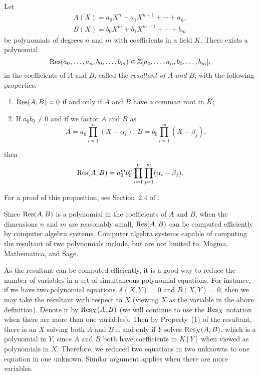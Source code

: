 \begin{proposition}
  Let
  \[
  \begin{gathered}
    A(X) = a_0 X^n + a_1 X^{n-1} + \cdots + a_n,\\
    B(X) = b_0 X^m + b_1 X^{m-1} + \cdots + b_m
  \end{gathered}
  \]
  be polynomials of degrees $n$ and $m$ with coefficients
  in a field $K$. There exists a polynomial
  \[
  \mathrm{Res}(a_0, \dots, a_n, b_0, \dots, b_m) \in \mathbb{Z}[a_0, \dots, a_n, b_0,
  \dots, b_m],
  \]
  in the coefficients of $A$ and $B$, called the \emph{resultant of
    $A$ and $B$}, with the following properties:
  \begin{enumerate}
  \item $\mathrm{Res}(A, B) = 0$ if and only if $A$ and $B$ have a comman root
    in $\bar{K}$;

  \item If $a_0 b_0 \ne 0$ and if we factor $A$ and $B$ as
    \[
    A = a_0 \prod_{i=1}^n (X - \alpha_i),\,
    B = b_0 \prod_{i=1}^m (X - \beta_j),
    \]
  \end{enumerate}
  then
  \[
  \mathrm{Res}(A, B) = a_0^m b_0^n \prod_{i=1}^n \prod_{j=1}^m (\alpha_i -
  \beta_j).
  \]
\end{proposition}

For a proof of this proposition, see Section~2.4 of \cite{MR2316407}.

\begin{remark}
  Since $\mathrm{Res}(A, B)$ is a polynomial in the coefficients of $A$ and
  $B$, when the dimensions $n$ and $m$ are reasonably small, $\mathrm{Res}(A,
  B)$ can be computed efficiently by computer algebra
  systems. Computer algebra systems capable of computing the resultant
  of two polynomials include, but are not limited to, Magma,
  Mathematica, and Sage.

  As the resultant can be computed efficiently, it is a good way to
  reduce the number of variables in a set of simultaneous polynomial
  equations. For instance, if we have two polynomial equations $A(X,
  Y) = 0$ and $B(X, Y) = 0$, then we may take the resultant with
  respect to $X$ (viewing $X$ as the variable in the above
  definition). Denote it by $\mathrm{Res}_X(A, B)$ (we will continue to use
  the $\mathrm{Res}_X$ notation when there are more than one variables). Then
  by Property~(1) of the resultant, there is an $X$ solving both $A$
  and $B$ if and only if $Y$ solves $\mathrm{Res}_X(A, B)$, which is a
  polynomial in $Y$, since $A$ and $B$ both have coefficients in
  $K[Y]$ when viewed as polynomials in $X$. Therefore, we reduced two
  equations in two unknowns to one equation in one unknown. Similar
  argument applies when there are more variables.
\end{remark}


